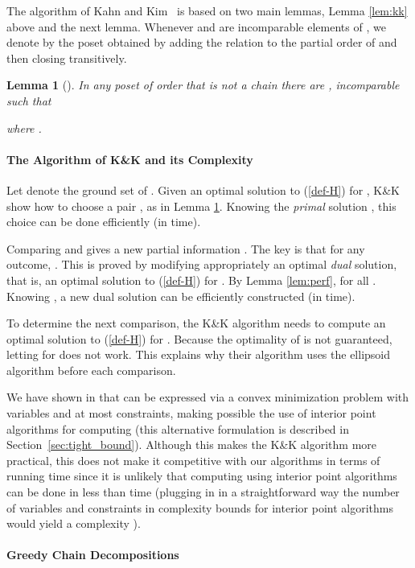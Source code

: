 \documentclass{article} \usepackage{fullpage}
\newtheorem{lemma}{Lemma}
\begin{document}
The algorithm of Kahn and Kim~\cite{KK95} is based on two main lemmas, Lemma \ref{lem:kk} above and the next lemma. Whenever  and  are incomparable elements of , we denote by  the poset obtained by adding the relation  to the partial order of  and then closing transitively.

\begin{lemma}[\cite{KK95}]
\label{lem:kk2}
In any poset  of order  that is not a chain there are ,  incomparable such that

where .
\end{lemma}

\paragraph*{The Algorithm of K\&K and its Complexity}

Let  denote the ground set of . Given an optimal solution  to (\ref{def-H}) for , K\&K show how to choose a pair ,  as in Lemma \ref{lem:kk2}. Knowing the {\sl primal\/} solution , this choice can be done efficiently (in  time).


Comparing  and  gives a new partial information . The key is that for any outcome, . This is proved by modifying appropriately an optimal {\sl dual\/} solution, that is, an optimal solution  to (\ref{def-H}) for . By Lemma \ref{lem:perf},  for all . Knowing , a new dual solution  can be efficiently constructed (in  time).

To determine the next comparison, the K\&K algorithm needs to compute an optimal solution  to (\ref{def-H}) for . Because the optimality of  is not guaranteed, letting  for  does not work. This explains why their algorithm uses the ellipsoid algorithm before each comparison.

We have shown in \cite{POP_SICOMP} that  can be expressed via a convex minimization problem with  variables and at most  constraints, making possible the use of interior point algorithms for computing  (this alternative formulation is described in Section~\ref{sec:tight_bound}).
Although this makes the K\&K algorithm more practical, this does not make it competitive with our algorithms in terms of running time since it is unlikely that computing  using interior point algorithms can be done in less than  time (plugging in in a straightforward way the number of variables and constraints in complexity bounds for interior point algorithms would yield a  complexity \cite{BV04}).

\paragraph*{Greedy Chain Decompositions}
\end{document}
